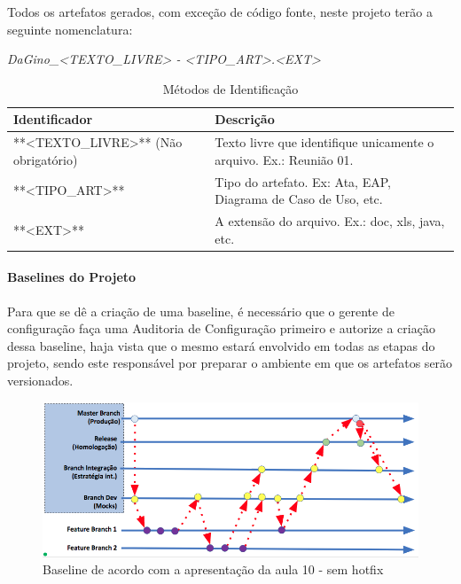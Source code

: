  Todos os artefatos gerados, com exceção de código fonte, neste projeto terão a seguinte nomenclatura:

\begin{myprop}
\textit{DaGino\_<TEXTO\_LIVRE> - <TIPO\_ART>.<EXT>}
\end{myprop}


\begin{table}[H]
      \begin{center}
        \begin{tabular}{| l | p{6cm} |}
        \hline
        \textbf{Identificador} & \textbf{Descrição} \\ \hline
        **<TEXTO\_LIVRE>** (Não obrigatório) & Texto livre que identifique unicamente o arquivo. Ex.: Reunião 01. \\ \hline
        **<TIPO\_ART>** & Tipo do artefato. Ex: Ata, EAP, Diagrama de Caso de Uso, etc. \\ \hline
        **<EXT>** & A extensão do arquivo. Ex.: doc, xls, java, etc. \\ \hline
        \end{tabular}
      \end{center}
    \caption{Métodos de Identificação}
    \end{table}

\paragraph{Baselines do Projeto}

Para que se dê a criação de uma baseline, é necessário que o gerente de configuração faça uma Auditoria de Configuração primeiro e autorize a criação dessa baseline, haja vista que o mesmo estará envolvido em todas as etapas do projeto, sendo este responsável por preparar o ambiente em que os artefatos serão versionados.

\begin{figure}[H]
  \centering
  \includegraphics[width=1\textwidth]{softwareengineer/images/baseline} 
  \caption{Baseline de acordo com a apresentação da aula 10 - sem hotfix}
  \label{fig:baseline} 
\end{figure}


